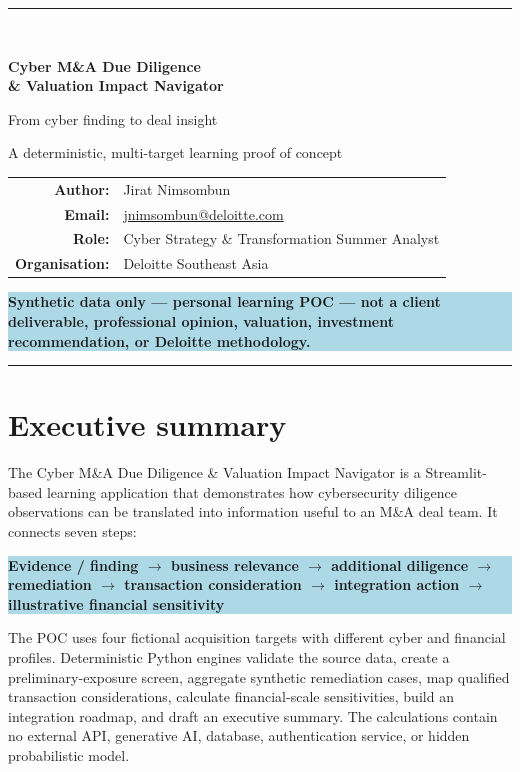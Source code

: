 \documentclass[11pt,a4paper]{article}
\newcommand{\poc}{Cyber M\&A Due Diligence \& Valuation Impact Navigator}
\newcommand{\callout}[1]{%
  \begin{center}
  \colorbox{lightblue}{\parbox{0.92\linewidth}{\color{navy}\textbf{#1}}}
  \end{center}}
\begin{document}
\begin{titlepage}
  \centering
  \vspace*{2.2cm}
  {\color{navy}\rule{\textwidth}{1.2pt}}\\[1.2cm]
  {\Huge\bfseries\color{navy} Cyber M\&A Due Diligence\\[0.25cm]
  \& Valuation Impact Navigator\par}
  \vspace{0.55cm}
  {\Large From cyber finding to deal insight\par}
  \vspace{1.2cm}
  {\large A deterministic, multi-target learning proof of concept\par}
  \vfill
  \begin{tabular}{rl}
    \textbf{Author:} & Jirat Nimsombun \\
    \textbf{Email:} & \href{mailto:jnimsombun@deloitte.com}{jnimsombun@deloitte.com} \\
    \textbf{Role:} & Cyber Strategy \& Transformation Summer Analyst \\
    \textbf{Organisation:} & Deloitte Southeast Asia \\
  \end{tabular}
  \vfill
  \callout{Synthetic data only --- personal learning POC --- not a client deliverable, professional opinion, valuation, investment recommendation, or Deloitte methodology.}
  \vspace{0.5cm}
  {\color{navy}\rule{\textwidth}{1.2pt}}
\end{titlepage}

\tableofcontents
\newpage

\section{Executive summary}

The \poc{} is a Streamlit-based learning application that demonstrates how cybersecurity diligence observations can be translated into information useful to an M\&A deal team. It connects seven steps:

\callout{Evidence / finding $\rightarrow$ business relevance $\rightarrow$ additional diligence $\rightarrow$ remediation $\rightarrow$ transaction consideration $\rightarrow$ integration action $\rightarrow$ illustrative financial sensitivity}

The POC uses four fictional acquisition targets with different cyber and financial profiles. Deterministic Python engines validate the source data, create a preliminary-exposure screen, aggregate synthetic remediation cases, map qualified transaction considerations, calculate financial-scale sensitivities, build an integration roadmap, and draft an executive summary. The calculations contain no external API, generative AI, database, authentication service, or hidden probabilistic model.
\end{document}
